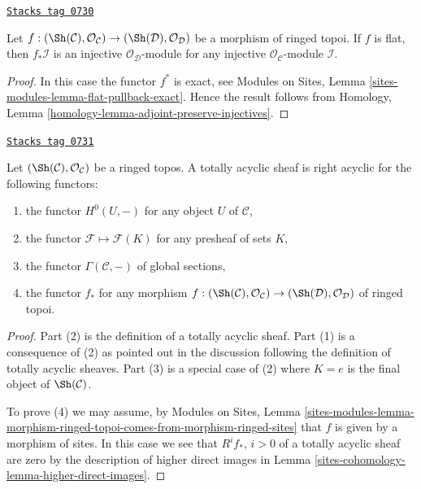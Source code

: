 \begin{lemma}
\label{sites-cohomology-lemma-pushforward-injective-flat}
\href{https://stacks.math.columbia.edu/tag/0730}{\texttt{Stacks tag 0730}}

Let $f : (\Sh(\mathcal{C}), \mathcal{O}_\mathcal{C}) \to
(\Sh(\mathcal{D}), \mathcal{O}_\mathcal{D})$ be a morphism of ringed topoi.
If $f$ is flat, then $f_*\mathcal{I}$ is an injective
$\mathcal{O}_\mathcal{D}$-module
for any injective $\mathcal{O}_\mathcal{C}$-module $\mathcal{I}$.
\end{lemma}

\begin{proof}
In this case the functor $f^*$ is exact, see
Modules on Sites, Lemma \ref{sites-modules-lemma-flat-pullback-exact}.
Hence the result follows from
Homology, Lemma \ref{homology-lemma-adjoint-preserve-injectives}.
\end{proof}

\begin{lemma}
\label{sites-cohomology-lemma-limp-acyclic}
\href{https://stacks.math.columbia.edu/tag/0731}{\texttt{Stacks tag 0731}}

Let $(\Sh(\mathcal{C}), \mathcal{O}_\mathcal{C})$ be a ringed topos.
A totally acyclic sheaf is right acyclic for the following functors:
\begin{enumerate}
\item the functor $H^0(U, -)$ for any object $U$ of $\mathcal{C}$,
\item the functor $\mathcal{F} \mapsto \mathcal{F}(K)$ for any
presheaf of sets $K$,
\item the functor $\Gamma(\mathcal{C}, -)$ of global sections,
\item the functor $f_*$ for any morphism
$f : (\Sh(\mathcal{C}), \mathcal{O}_\mathcal{C}) \to
(\Sh(\mathcal{D}), \mathcal{O}_\mathcal{D})$ of ringed topoi.
\end{enumerate}
\end{lemma}

\begin{proof}
Part (2) is the definition of a totally acyclic sheaf.
Part (1) is a consequence of (2) as pointed out in the discussion following the
definition of totally acyclic sheaves.
Part (3) is a special case of (2) where $K = e$ is the final object
of $\Sh(\mathcal{C})$.

\medskip\noindent
To prove (4) we may assume, by
Modules on Sites, Lemma
\ref{sites-modules-lemma-morphism-ringed-topoi-comes-from-morphism-ringed-sites}
that $f$ is given by a morphism of sites. In this case we see that
$R^if_*$, $i > 0$ of a totally acyclic sheaf are zero by the description of
higher direct images in
Lemma \ref{sites-cohomology-lemma-higher-direct-images}.
\end{proof}

